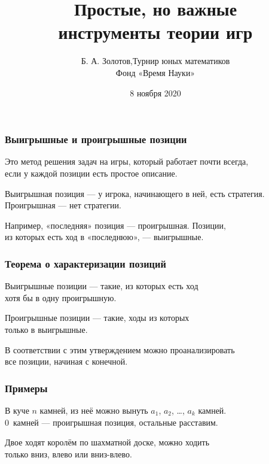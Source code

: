 \documentclass[aspectratio=1610,12pt,notheorems]{beamer}
\title[Introduction to Game Theory]
    {\bfseries Простые, но важные \\ инструменты теории игр}
\author[\ ]
	{Б. А. Золотов,\quad Турнир юных математиков\\ \vspace{0.3cm}
		{\small Фонд «Время Науки»}}
\institute[\ ]{\ }
\date{8 ноября 2020}
\begin{document}
\frame{\titlepage}





\begin{frame} \frametitle{Выигрышные и проигрышные позиции}
Это метод решения задач на игры, который работает почти всегда, \\
если у каждой позиции есть простое описание.

Выигрышная позиция — у игрока, начинающего в ней, есть стратегия. \\
Проигрышная — нет стратегии.

Например, «последняя» позиция — проигрышная. Позиции, \\
из которых есть ход в «последнюю», — выигрышные.
\end{frame}

\begin{frame} \frametitle{Теорема о характеризации позиций}
Выигрышные позиции — такие, из которых есть ход \\
хотя бы в одну проигрышную.

Проигрышные позиции — такие, ходы из которых \\
только в выигрышные.

В соответствии с этим утверждением можно проанализировать \\
все позиции, начиная с конечной.
\end{frame}

\begin{frame} \frametitle{Примеры}
В куче $n$ камней, из неё можно вынуть $a_1$, $a_2$, \ldots, $a_k$ камней. \\
0~камней — проигрышная позиция, остальные расставим. \pause

Двое ходят королём по шахматной доске, можно ходить \\
только вниз, влево или вниз-влево. \pause

\begin{center}  \end{center}
\end{frame}
\end{document}
